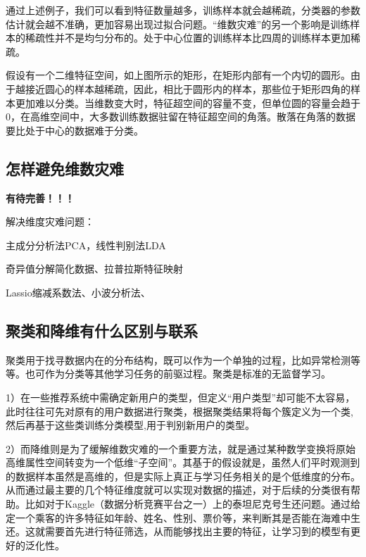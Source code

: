 ​
通过上述例子，我们可以看到特征数量越多，训练样本就会越稀疏，分类器的参数估计就会越不准确，更加容易出现过拟合问题。``维数灾难''的另一个影响是训练样本的稀疏性并不是均匀分布的。处于中心位置的训练样本比四周的训练样本更加稀疏。

 

​
假设有一个二维特征空间，如上图所示的矩形，在矩形内部有一个内切的圆形。由于越接近圆心的样本越稀疏，因此，相比于圆形内的样本，那些位于矩形四角的样本更加难以分类。当维数变大时，特征超空间的容量不变，但单位圆的容量会趋于0，在高维空间中，大多数训练数据驻留在特征超空间的角落。散落在角落的数据要比处于中心的数据难于分类。

\subsection{怎样避免维数灾难}\label{ux600eux6837ux907fux514dux7ef4ux6570ux707eux96be}

\textbf{有待完善！！！}

解决维度灾难问题：

主成分分析法PCA，线性判别法LDA

奇异值分解简化数据、拉普拉斯特征映射

Lassio缩减系数法、小波分析法、

\subsection{聚类和降维有什么区别与联系}\label{ux805aux7c7bux548cux964dux7ef4ux6709ux4ec0ux4e48ux533aux522bux4e0eux8054ux7cfb}

​
聚类用于找寻数据内在的分布结构，既可以作为一个单独的过程，比如异常检测等等。也可作为分类等其他学习任务的前驱过程。聚类是标准的无监督学习。

​
1）在一些推荐系统中需确定新用户的类型，但定义``用户类型''却可能不太容易，此时往往可先对原有的用户数据进行聚类，根据聚类结果将每个簇定义为一个类,然后再基于这些类训练分类模型,用于判别新用户的类型。

 

​
2）而降维则是为了缓解维数灾难的一个重要方法，就是通过某种数学变换将原始高维属性空间转变为一个低维``子空间''。其基于的假设就是，虽然人们平时观测到的数据样本虽然是高维的，但是实际上真正与学习任务相关的是个低维度的分布。从而通过最主要的几个特征维度就可以实现对数据的描述，对于后续的分类很有帮助。比如对于Kaggle（数据分析竞赛平台之一）上的泰坦尼克号生还问题。通过给定一个乘客的许多特征如年龄、姓名、性别、票价等，来判断其是否能在海难中生还。这就需要首先进行特征筛选，从而能够找出主要的特征，让学习到的模型有更好的泛化性。

